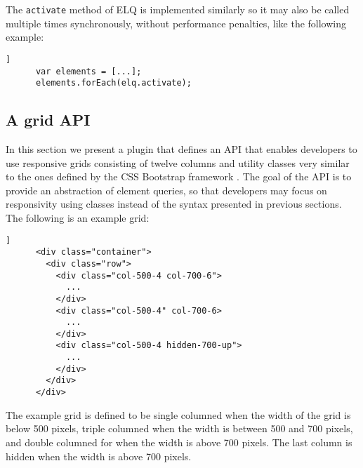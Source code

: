 \documentclass{llncs}
\newcommand{\code}[1]{\texttt{#1}}
\newcommand{\elq}{ELQ}
\begin{document}
    \noindent
    The \code{activate} method of \elq{} is implemented similarly so it may also be called multiple times synchronously, without performance penalties, like the following example:

    \begin{lstlisting}[gobble=6,label={},caption={},captionpos=b]]
      var elements = [...];
      elements.forEach(elq.activate);
    \end{lstlisting}

  \subsection{A grid API}\label{grid-api}
    In this section we present a plugin that defines an API that enables developers to use responsive grids consisting of twelve columns and utility classes very similar to the ones defined by the CSS Bootstrap framework \cite{bootstrap}.
    The goal of the API is to provide an abstraction of element queries, so that developers may focus on responsivity using classes instead of the syntax presented in previous sections.
    The following is an example grid:




    \begin{lstlisting}[gobble=8,caption={},captionpos=b,label={}]]
      <div class="container">
        <div class="row">
          <div class="col-500-4 col-700-6">
            ...
          </div>
          <div class="col-500-4" col-700-6>
            ...
          </div>
          <div class="col-500-4 hidden-700-up">
            ...
          </div>
        </div>
      </div>
    \end{lstlisting}

    \noindent
    The example grid is defined to be single columned when the width of the grid is below 500 pixels, triple columned when the width is between 500 and 700 pixels, and double columned for when the width is above 700 pixels.
    The last column is hidden when the width is above 700 pixels.
\end{document}
